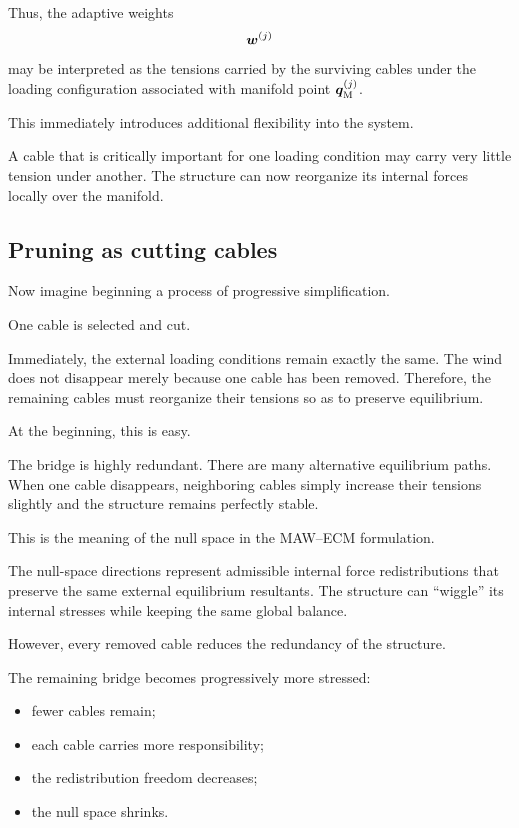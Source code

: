 \documentclass[11pt,a4paper]{article}
\begin{document}
Thus, the adaptive weights
\[
        \bm w^{(j)}
\]
may be interpreted as the tensions carried by the surviving cables under the
loading configuration associated with manifold point $\bm q_{\mathrm{M}}^{(j)}$.

This immediately introduces additional flexibility into the system.

A cable that is critically important for one loading condition may carry very
little tension under another. The structure can now reorganize its internal
forces locally over the manifold.

\subsection{Pruning as cutting cables}

Now imagine beginning a process of progressive simplification.

One cable is selected and cut.

Immediately, the external loading conditions remain exactly the same. The wind
does not disappear merely because one cable has been removed. Therefore, the
remaining cables must reorganize their tensions so as to preserve equilibrium.

At the beginning, this is easy.

The bridge is highly redundant. There are many alternative equilibrium paths.
When one cable disappears, neighboring cables simply increase their tensions
slightly and the structure remains perfectly stable.

This is the meaning of the null space in the MAW--ECM formulation.

The null-space directions represent admissible internal force redistributions
that preserve the same external equilibrium resultants. The structure can
``wiggle'' its internal stresses while keeping the same global balance.

However, every removed cable reduces the redundancy of the structure.

The remaining bridge becomes progressively more stressed:
\begin{itemize}
    \item fewer cables remain;
    \item each cable carries more responsibility;
    \item the redistribution freedom decreases;
    \item the null space shrinks.
\end{itemize}
\end{document}
